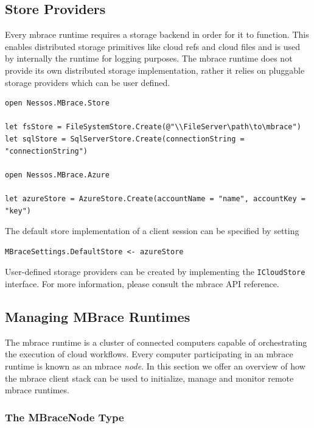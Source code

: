 \documentclass[9pt,a4paper]{article}
\newcommand{\mbrace}{mbrace}
\newcommand{\TitularMbrace}{MBrace}
\begin{document}
\subsection{Store Providers}

Every \mbrace{} runtime requires a storage backend in order for it to function.
This enables distributed storage primitives like cloud refs and cloud files and
is used by internally the runtime for logging purposes.
The \mbrace{} runtime does not provide its own distributed storage implementation, 
rather it relies on pluggable storage providers which can be user defined.
\begin{lstlisting}
open Nessos.MBrace.Store

let fsStore = FileSystemStore.Create(@"\\FileServer\path\to\mbrace")
let sqlStore = SqlServerStore.Create(connectionString = "connectionString")

open Nessos.MBrace.Azure

let azureStore = AzureStore.Create(accountName = "name", accountKey = "key")
\end{lstlisting}
The default store implementation of a client session can be specified by setting
\begin{lstlisting}
MBraceSettings.DefaultStore <- azureStore
\end{lstlisting}
User-defined storage providers can be created by implementing the \texttt{ICloudStore} interface. 
For more information, please consult the \mbrace{} API reference.

\subsection{Managing \TitularMbrace{} Runtimes}

The \mbrace{} runtime is a cluster of connected computers capable of orchestrating the execution
of cloud workflows. Every computer participating in an \mbrace{} runtime is known as an \mbrace{}
\emph{node}. In this section we offer an overview of how the \mbrace{} client stack can be
used to initialize, manage and monitor remote \mbrace{} runtimes.

\subsubsection*{The MBraceNode Type}
\end{document}
